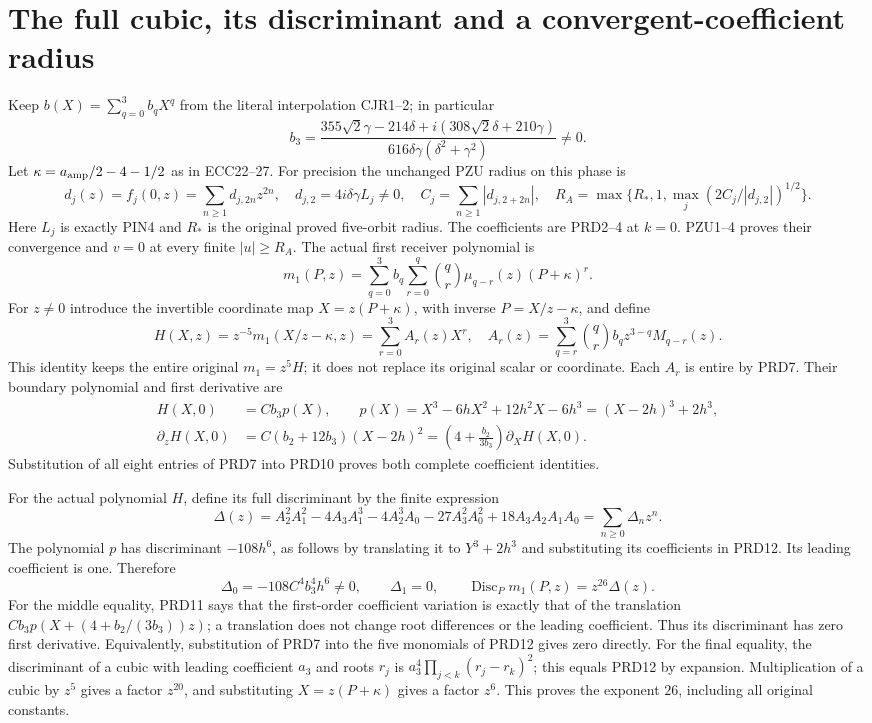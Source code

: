 \section{The full cubic, its discriminant and a convergent-coefficient radius}
Keep $b(X)=\sum_{q=0}^3b_qX^q$ from the literal interpolation
CJR1--2; in particular
\[
 b_3=\frac{355\sqrt2\gamma-214\delta+
                   i(308\sqrt2\delta+210\gamma)}
                   {616\delta\gamma(\delta^2+\gamma^2)}\ne0.
 \tag{PRD8}
\]
Let $\kappa=a_{\rm amp}/2-4-1/2$ as in ECC22--27.
For precision the unchanged PZU radius on this phase is
\[
 d_j(z)=f_j(0,z)=\sum_{n\ge1}d_{j,2n}z^{2n},\quad
 d_{j,2}=4i\delta\gamma L_j\ne0,\quad
 C_j=\sum_{n\ge1}|d_{j,2+2n}|,\quad
 R_A=\max\{R_*,1,\max_j(2C_j/|d_{j,2}|)^{1/2}\}.
 \tag{PRD8a}
\]
Here $L_j$ is exactly PIN4 and $R_*$ is the original proved
five-orbit radius. The coefficients are PRD2--4 at $k=0$.
PZU1--4 proves their convergence and $v=0$ at every finite
$|u|\ge R_A$. The actual first receiver polynomial is
\[
 m_1(P,z)=\sum_{q=0}^3b_q\sum_{r=0}^q
          \binom qr\mu_{q-r}(z)(P+\kappa)^r.
 \tag{PRD9}
\]
For $z\ne0$ introduce the invertible coordinate map
$X=z(P+\kappa)$, with inverse $P=X/z-\kappa$, and define
\[
 H(X,z)=z^{-5}m_1(X/z-\kappa,z)=\sum_{r=0}^3A_r(z)X^r,
 \quad
 A_r(z)=\sum_{q=r}^3\binom qr b_qz^{3-q}M_{q-r}(z).
 \tag{PRD10}
\]
This identity keeps the entire original $m_1=z^5H$; it does
not replace its original scalar or coordinate. Each $A_r$ is
entire by PRD7. Their boundary polynomial and first derivative are
\[
\begin{split}
 H(X,0)&=Cb_3p(X),\qquad
 p(X)=X^3-6hX^2+12h^2X-6h^3=(X-2h)^3+2h^3,\\
 \partial_zH(X,0)&=C(b_2+12b_3)(X-2h)^2
       =\left(4+\frac{b_2}{3b_3}\right)\partial_XH(X,0).
\end{split}\tag{PRD11}
\]
Substitution of all eight entries of PRD7 into PRD10 proves
both complete coefficient identities.

For the actual polynomial $H$, define its full discriminant
by the finite expression
\[
 \Delta(z)=A_2^2A_1^2-4A_3A_1^3-4A_2^3A_0
                    -27A_3^2A_0^2+18A_3A_2A_1A_0
             =\sum_{n\ge0}\Delta_nz^n.
 \tag{PRD12}
\]
The polynomial $p$ has discriminant $-108h^6$, as follows
by translating it to $Y^3+2h^3$ and substituting its coefficients
in PRD12. Its leading coefficient is one. Therefore
\[
 \Delta_0=-108C^4b_3^4h^6\ne0,\qquad \Delta_1=0,
 \qquad
 \operatorname{Disc}_P m_1(P,z)=z^{26}\Delta(z).
 \tag{PRD13}
\]
For the middle equality, PRD11 says that the first-order
coefficient variation is exactly that of the translation
$Cb_3p(X+(4+b_2/(3b_3))z)$; a translation does not change
root differences or the leading coefficient. Thus its discriminant
has zero first derivative. Equivalently, substitution of PRD7
into the five monomials of PRD12 gives zero directly.
For the final equality, the discriminant of a cubic with leading
coefficient $a_3$ and roots $r_j$ is
$a_3^4\prod_{j<k}(r_j-r_k)^2$; this equals PRD12 by expansion.
Multiplication of a cubic by $z^5$ gives a factor $z^{20}$,
and substituting $X=z(P+\kappa)$ gives a factor $z^6$.
This proves the exponent $26$, including all original constants.

